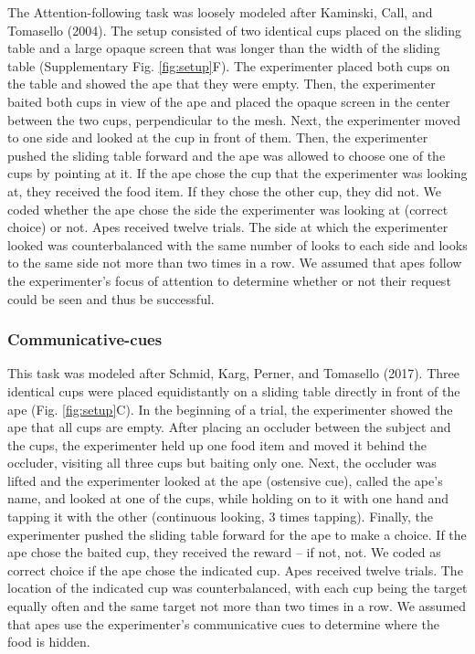\documentclass[
  man,floatsintext]{apa6}
\begin{document}
The Attention-following task was loosely modeled after Kaminski, Call, and Tomasello (2004). The setup consisted of two identical cups placed on the sliding table and a large opaque screen that was longer than the width of the sliding table (Supplementary Fig. \ref{fig:setup}F). The experimenter placed both cups on the table and showed the ape that they were empty. Then, the experimenter baited both cups in view of the ape and placed the opaque screen in the center between the two cups, perpendicular to the mesh. Next, the experimenter moved to one side and looked at the cup in front of them. Then, the experimenter pushed the sliding table forward and the ape was allowed to choose one of the cups by pointing at it. If the ape chose the cup that the experimenter was looking at, they received the food item. If they chose the other cup, they did not. We coded whether the ape chose the side the experimenter was looking at (correct choice) or not. Apes received twelve trials. The side at which the experimenter looked was counterbalanced with the same number of looks to each side and looks to the same side not more than two times in a row. We assumed that apes follow the experimenter's focus of attention to determine whether or not their request could be seen and thus be successful.

\subsubsection{Communicative-cues}\label{communicative-cues}

This task was modeled after Schmid, Karg, Perner, and Tomasello (2017). Three identical cups were placed equidistantly on a sliding table directly in front of the ape (Fig. \ref{fig:setup}C). In the beginning of a trial, the experimenter showed the ape that all cups are empty. After placing an occluder between the subject and the cups, the experimenter held up one food item and moved it behind the occluder, visiting all three cups but baiting only one. Next, the occluder was lifted and the experimenter looked at the ape (ostensive cue), called the ape's name, and looked at one of the cups, while holding on to it with one hand and tapping it with the other (continuous looking, 3 times tapping). Finally, the experimenter pushed the sliding table forward for the ape to make a choice. If the ape chose the baited cup, they received the reward -- if not, not. We coded as correct choice if the ape chose the indicated cup. Apes received twelve trials. The location of the indicated cup was counterbalanced, with each cup being the target equally often and the same target not more than two times in a row. We assumed that apes use the experimenter's communicative cues to determine where the food is hidden.
\end{document}
